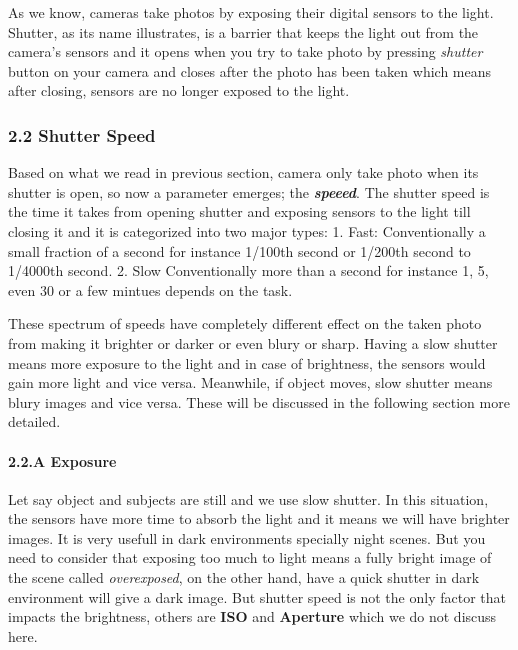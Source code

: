 \documentclass[11pt]{article}
\begin{document}
As we know, cameras take photos by exposing their digital sensors to the
light. Shutter, as its name illustrates, is a barrier that keeps the
light out from the camera's sensors and it opens when you try to take
photo by pressing \emph{shutter} button on your camera and closes after
the photo has been taken which means after closing, sensors are no
longer exposed to the light.

\hypertarget{shutter-speed}{%
\subsubsection{2.2 Shutter Speed}\label{shutter-speed}}

Based on what we read in previous section, camera only take photo when
its shutter is open, so now a parameter emerges; the
\emph{\textbf{speeed}}. The shutter speed is the time it takes from
opening shutter and exposing sensors to the light till closing it and it
is categorized into two major types: 1. Fast: Conventionally a small
fraction of a second for instance 1/100th second or 1/200th second to
1/4000th second. 2. Slow Conventionally more than a second for instance
1, 5, even 30 or a few mintues depends on the task.

These spectrum of speeds have completely different effect on the taken
photo from making it brighter or darker or even blury or sharp. Having a
slow shutter means more exposure to the light and in case of brightness,
the sensors would gain more light and vice versa. Meanwhile, if object
moves, slow shutter means blury images and vice versa. These will be
discussed in the following section more detailed.

\hypertarget{a-exposure}{%
\paragraph{2.2.A Exposure}\label{a-exposure}}

Let say object and subjects are still and we use slow shutter. In this
situation, the sensors have more time to absorb the light and it means
we will have brighter images. It is very usefull in dark environments
specially night scenes. But you need to consider that exposing too much
to light means a fully bright image of the scene called
\emph{overexposed}, on the other hand, have a quick shutter in dark
environment will give a dark image. But shutter speed is not the only
factor that impacts the brightness, others are \textbf{ISO} and
\textbf{Aperture} which we do not discuss here.
\end{document}
